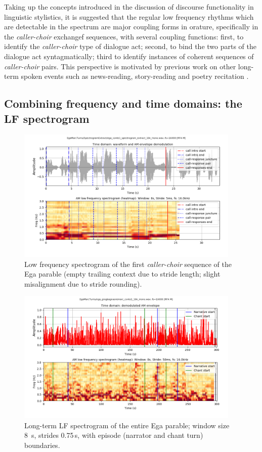 \documentclass[output=paper,colorlinks,citecolor=brown
]{langscibook}
\begin{document}
Taking up the concepts introduced in the discussion of discourse functionality in linguistic stylistics, it is suggested that the regular low frequency rhythms which are detectable in the spectrum are major coupling forms in orature, specifically in the \textit{caller-choir} exchangef sequences, with several coupling functions: first, to identify the \textit{caller-choir} type of dialogue act; second, to bind the two parts of the dialogue act syntagmatically; third to identify instances of coherent sequences of \textit{caller-choir} pairs. This perspective is motivated by previous work on other long-term spoken events such as news-reading, story-reading and poetry recitation \cite{gibbonjipa2021, gibbonsp2022, gibbon4urua2022}.

\subsection{Combining frequency and time domains: the LF spectrogram}

\begin{figure}[ht]
\centering
\includegraphics[trim={1.5cm 1cm 0 0}, clip, width=0.95\textwidth]{gibbon_figure07.png}
\caption{\label{fig:fig07}Low frequency spectrogram of the first \textit{caller-choir} sequence of the Ega parable (empty trailing context due to stride length; slight misalignment due to stride rounding).}
\end{figure}
\begin{figure}[ht]
\centering
\includegraphics[trim={1.5cm 1cm 0 0}, clip, width=0.95\textwidth]{gibbon_figure08.png}
\caption{\label{fig:fig08}Long-term LF spectrogram of the entire Ega parable; window size 8 s, strides 0.75\,s, with episode (narrator and chant turn) boundaries.}
\end{figure}
\end{document}

